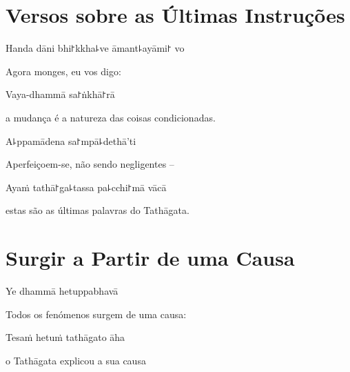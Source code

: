 \chapter[As Últimas Instruções]{Versos sobre as Últimas Instruções}


\begin{leader}
\end{leader}

Handa dāni bhi꜓kkha꜕ve āmant꜕ayāmi꜓ vo

\begin{english}
  Agora monges, eu vos digo:
\end{english}

Vaya-dhammā sa꜓ṅkhā꜓rā

\begin{english}
  a mudança é a natureza das coisas condicionadas.
\end{english}

A꜕ppamādena sa꜓mpā꜕dethā'ti

\begin{english}
  Aperfeiçoem-se, não sendo negligentes --
\end{english}

Ayaṁ tathā꜓ga꜕tassa pa꜕cchi꜓mā vācā

\begin{english}
  estas são as últimas palavras do Tathāgata.
\end{english}

\chapter{Surgir a Partir de uma Causa}


\begin{leader}
\end{leader}

Ye dhammā hetuppabhavā

\begin{english}
  Todos os fenómenos surgem de uma causa:
\end{english}

Tesaṁ hetuṁ tathāgato āha

\begin{english}
  o Tathāgata explicou a sua causa
\end{english}

